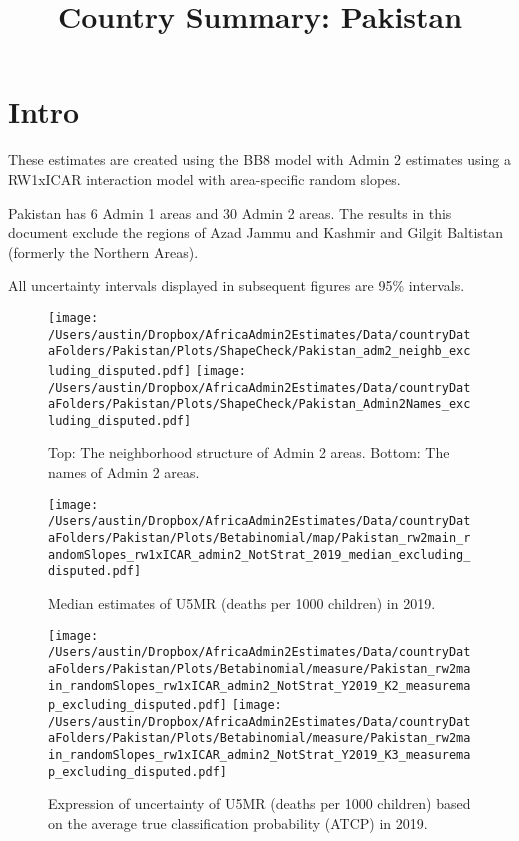 \documentclass[]{article}
\title{Country Summary: Pakistan}
\author{}
\date{\vspace{-2.5em}}
\begin{document}
\maketitle

{
\setcounter{tocdepth}{2}
\tableofcontents
}
\hypertarget{intro}{%
\section{Intro}\label{intro}}

These estimates are created using the BB8 model with Admin 2 estimates
using a RW1xICAR interaction model with area-specific random slopes.

\par

Pakistan has 6 Admin 1 areas and 30 Admin 2 areas. The results in this
document exclude the regions of Azad Jammu and Kashmir and Gilgit
Baltistan (formerly the Northern Areas).

\par

All uncertainty intervals displayed in subsequent figures are 95\%
intervals.

\begin{figure}
\centering
\texttt{[image: /Users/austin/Dropbox/AfricaAdmin2Estimates/Data/countryDataFolders/Pakistan/Plots/ShapeCheck/Pakistan\_adm2\_neighb\_excluding\_disputed.pdf]}
\texttt{[image: /Users/austin/Dropbox/AfricaAdmin2Estimates/Data/countryDataFolders/Pakistan/Plots/ShapeCheck/Pakistan\_Admin2Names\_excluding\_disputed.pdf]}
\caption{Top: The neighborhood structure of Admin 2 areas. Bottom: The names of Admin 2 areas.}
\end{figure}
\clearpage

\begin{figure}
\centering
\texttt{[image: /Users/austin/Dropbox/AfricaAdmin2Estimates/Data/countryDataFolders/Pakistan/Plots/Betabinomial/map/Pakistan\_rw2main\_randomSlopes\_rw1xICAR\_admin2\_NotStrat\_2019\_median\_excluding\_disputed.pdf]}
\caption{Median estimates of U5MR (deaths per 1000 children) in 2019.}
\end{figure}
\begin{figure}
\centering
\texttt{[image: /Users/austin/Dropbox/AfricaAdmin2Estimates/Data/countryDataFolders/Pakistan/Plots/Betabinomial/measure/Pakistan\_rw2main\_randomSlopes\_rw1xICAR\_admin2\_NotStrat\_Y2019\_K2\_measuremap\_excluding\_disputed.pdf]}
\texttt{[image: /Users/austin/Dropbox/AfricaAdmin2Estimates/Data/countryDataFolders/Pakistan/Plots/Betabinomial/measure/Pakistan\_rw2main\_randomSlopes\_rw1xICAR\_admin2\_NotStrat\_Y2019\_K3\_measuremap\_excluding\_disputed.pdf]}
\caption{Expression of uncertainty of U5MR (deaths per 1000 children) based on the average true classification probability (ATCP) in 2019.}
\end{figure}
\clearpage
\end{document}
